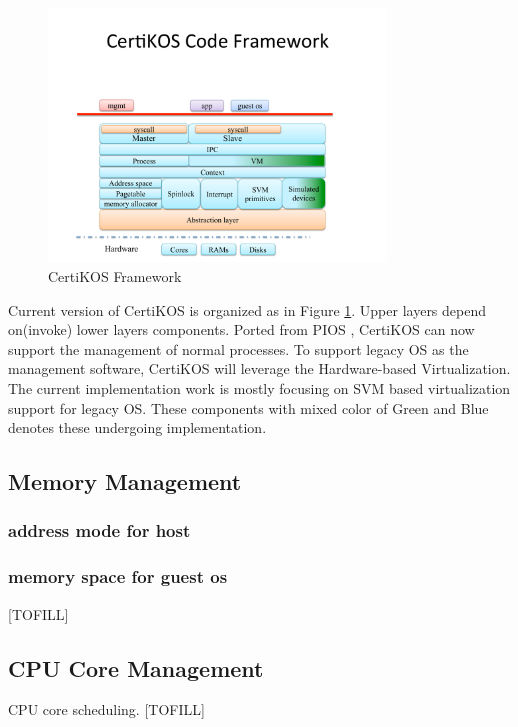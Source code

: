 \documentclass[a4paper,12pt]{article}
\begin{document}
\begin{figure}[!ht]
 \centerline{
 \includegraphics[width=0.8\textwidth]{certikos_framework}}
 \caption{CertiKOS Framework} \label{fig:framework}
\end{figure}

Current version of CertiKOS  is organized as in Figure \ref{fig:framework}. Upper layers depend on(invoke) lower layers components.  Ported from PIOS \cite{PIOS}, CertiKOS can now support the management of normal processes. To support legacy OS as the management software, CertiKOS will leverage the Hardware-based Virtualization. The current implementation work is mostly focusing on SVM based virtualization support for legacy OS.  These components with mixed color of Green and Blue denotes these undergoing implementation.

\subsection{Memory Management}

\subsubsection{address mode for host}

\subsubsection{memory space for guest os }

[TOFILL]
\subsection{CPU Core Management}

CPU core scheduling.
[TOFILL]
\end{document}
